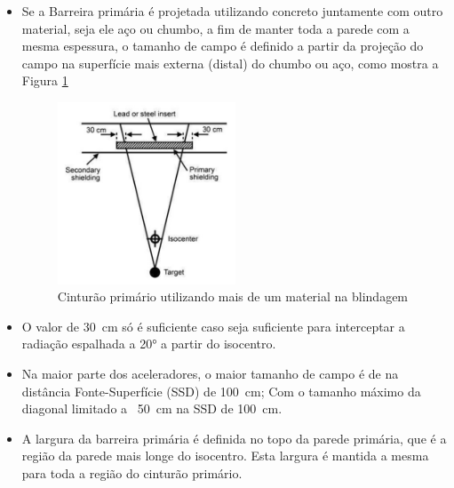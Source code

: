 \documentclass[11pt,a4paper]{article}
\begin{document}
\begin{itemize}
                
                \item Se a Barreira primária é projetada utilizando concreto juntamente com outro material, seja ele aço ou chumbo, a fim de manter toda a parede com a mesma espessura, o tamanho de campo é definido a partir da projeção do campo na superfície mais externa (distal) do chumbo ou aço, como mostra a Figura \ref{fig:esquemaCinturaoPrimarioDoisMateriaisDeBlindagem}
                    
                    \begin{figure}[h]
                        \centering
                        \includegraphics[width=0.5\textwidth]{Imagens/esquemaCinturaoPrimarioDoisMateriaisDeBlindagem.JPG}
                        \caption{Cinturão primário utilizando mais de um material na blindagem}
                        \label{fig:esquemaCinturaoPrimarioDoisMateriaisDeBlindagem}
                    \end{figure}
                
                \item O valor de \qty{30}{cm} só é suficiente caso seja suficiente para interceptar a radiação espalhada a \ang{20} a partir do isocentro. 
                
                \item Na maior parte dos aceleradores, o maior tamanho de campo é de  na distância Fonte-Superfície (SSD) de \qty{100}{cm}; Com o tamanho máximo da diagonal limitado a ~\qty{50}{cm} na SSD de \qty{100}{cm}. 
                
                \item A largura da barreira primária é definida no topo da parede primária, que é a região da parede mais longe do isocentro. Esta largura é mantida a mesma para toda a região do cinturão primário.
                

\end{itemize}
\end{document}
